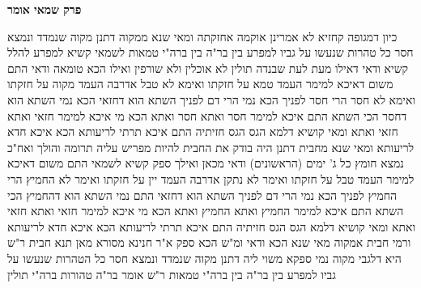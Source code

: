 \documentclass[12pt, openany]{book}
\newcommand{\sethebfont}{
\fontsize{10.5pt}{21.0pt} \selectfont
}
\newcommand{\twocol}[1]{
	{\sethebfont \begin{multicols}{2}
			#1
	\end{multicols}}	
}
\newcommand{\chapname}{}
\newcommand{\newchap}[1]{
	\addcontentsline{toc}{chapter}{#1}
	\renewcommand{\chapname}{#1}
		\begin{center}
			\textbf{%
\fontsize{16pt}{16pt}\selectfont
				#1}
		\end{center}
}
\begin{document}
\newchap{פרק  שמאי אומר}
\twocol{כיון דמגופה קחזיא לא אמרינן אוקמה אחזקתה 
ומאי שנא ממקוה דתנן מקוה שנמדד ונמצא חסר כל טהרות שנעשו על גביו למפרע בין בר"ה בין ברה"י טמאות 
לשמאי קשיא למפרע 
להלל קשיא ודאי דאילו מעת לעת שבנדה תולין לא אוכלין ולא שורפין ואילו הכא טומאה ודאי 
התם משום דאיכא למימר העמד טמא על חזקתו ואימא לא טבל אדרבה העמד מקוה על חזקתו ואימא לא חסר הרי חסר לפניך 
הכא נמי הרי דם לפניך השתא הוא דחזאי הכא נמי השתא הוא דחסר 
הכי השתא התם איכא למימר חסר ואתא חסר ואתא הכא מי איכא למימר חזאי ואתא חזאי ואתא ומאי קושיא דלמא הגס הגס חזיתיה 
התם איכא תרתי לריעותא הכא איכא חדא לריעותא 
ומאי שנא מחבית דתנן היה בודק את החבית להיות מפריש עליה תרומה והולך ואח"כ נמצא חומץ כל ג' ימים (הראשונים) ודאי
מכאן ואילך ספק קשיא לשמאי 
התם משום דאיכא למימר העמד טבל על חזקתו ואימר לא נתקן אדרבה העמד יין על חזקתו ואימר לא החמיץ 
הרי החמיץ לפניך הכא נמי הרי דם לפניך השתא הוא דחזאי התם נמי השתא הוא דהחמיץ 
הכי השתא התם איכא למימר החמיץ ואתא החמיץ ואתא הכא מי איכא למימר חזאי ואתא חזאי ואתא ומאי קושיא דלמא הגס הגס חזיתיה 
התם איכא תרתי לריעותא הכא איכא חדא לריעותא 
ורמי חבית אמקוה מאי שנא הכא ודאי ומ"ש הכא ספק 
א"ר חנינא מסורא מאן תנא חבית ר"ש היא דלגבי מקוה נמי ספקא משוי ליה 
דתנן מקוה שנמדד ונמצא חסר כל הטהרות שנעשו על גביו למפרע בין בר"ה בין ברה"י טמאות 
ר"ש אומר בר"ה טהורות ברה"י תולין}
\end{document}
